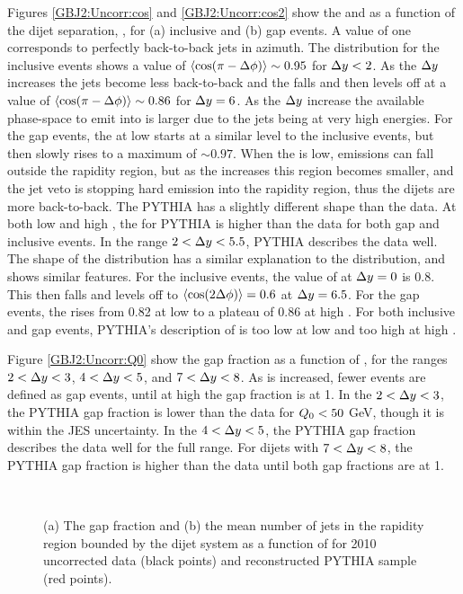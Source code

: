 Figures \ref{GBJ2:Uncorr:cos} and \ref{GBJ2:Uncorr:cos2} show the \mean{\cosdphi{}} and \mean{\costwodphi{}} as a function of the dijet separation, \dy{}, for (a) inclusive and (b) gap events.
A \mean{\cosdphi{}} value of one corresponds to perfectly back-to-back jets in azimuth.
The \mean{\cosdphi{}} distribution for the inclusive events shows a value of $ \mbox{$\langle \mbox{$\rm cos(\pi - \mbox{$\Delta{\rm \phi}$}{})$}{} \rangle$}\sim0.95$ for $\mbox{$\Delta y$}{}<2$.
As the $\mbox{$\Delta y$}{}$ increases the jets become less back-to-back and the \mean{\cosdphi{}} falls and then levels off at a value of $ \mbox{$\langle \mbox{$\rm cos(\pi - \mbox{$\Delta{\rm \phi}$}{})$}{} \rangle$}\sim0.86$ for $\mbox{$\Delta y$}{}=6$.
As the $\mbox{$\Delta y$}{}$ increase the available phase-space to emit into is larger due to the jets being at very high energies.
For the gap events, the \mean{\cosdphi{}} at low \dy{} starts at a similar level to the inclusive events, but then slowly rises to a maximum of $\sim 0.97$.
When the \dy{} is low, emissions can fall outside the rapidity region, but as the \dy{} increases this region becomes smaller, and the jet veto is stopping hard emission into the rapidity region, thus the dijets are more back-to-back.
The PYTHIA has a slightly different shape than the data.
At both low and high \dy{}, the \mean{\cosdphi{}} for PYTHIA is higher than the data for both gap and inclusive events. 
In the range $2<\mbox{$\Delta y$}{}<5.5$, PYTHIA describes the data well.
The shape of the \mean{\costwodphi{}} distribution has a similar explanation to the \mean{\cosdphi{}} distribution, and shows similar features.
For the inclusive events, the value of \mean{\costwodphi{}} at $\mbox{$\Delta y$}{}=0$ is 0.8.
This then falls and levels off to $\mbox{$\langle \mbox{$\rm cos(2\mbox{$\Delta{\rm \phi}$}{}) $}{} \rangle$}=0.6$ at $\mbox{$\Delta y$}{}=6.5$.
For the gap events, the \mean{\costwodphi{}}  rises from 0.82 at low \dy{} to a plateau of 0.86 at high \dy{}.
For both inclusive and gap events, PYTHIA's description of \mean{\costwodphi{}} is too low at low \dy{} and too high at high \dy{}.

Figure \ref{GBJ2:Uncorr:Q0} show the gap fraction as a function of \qz{}, for the \dy{} ranges $2<\mbox{$\Delta y$}{}<3$, $4<\mbox{$\Delta y$}{}<5$, and $7<\mbox{$\Delta y$}{}<8$.
As \qz{} is increased, fewer events are defined as gap events, until at high \qz{} the gap fraction is at 1.
In the $2<\mbox{$\Delta y$}{}<3$, the PYTHIA gap fraction is lower than the data for $\mbox{$Q_0$}{}<50$ GeV, though it is within the JES uncertainty.
In the $4<\mbox{$\Delta y$}{}<5$, the PYTHIA gap fraction describes the data well for the full \qz{} range.
For dijets with $7<\mbox{$\Delta y$}{}<8$, the PYTHIA gap fraction is higher than the data until both gap fractions are at 1.

\begin{figure}
\centering
\mbox{
              \quad
              \quad
                              }
\caption[Comparison of the data and PYTHIA for the gap fraction and mean number of jets]{
(a) The gap fraction  and (b) the mean number of jets in the rapidity region bounded by the dijet system as a function of \dy{} for 2010 uncorrected data (black points) and reconstructed PYTHIA sample (red points).
\label{GBJ2:Uncorr:Incl_Gap}}
\end{figure}




